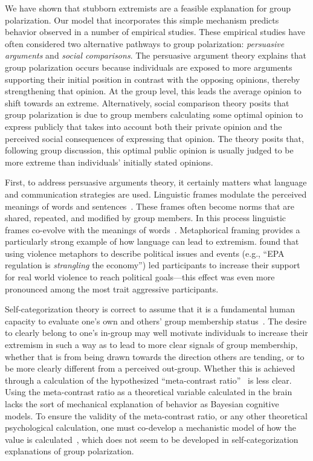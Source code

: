 We have shown that stubborn extremists are a feasible explanation for group
polarization. Our model that incorporates this simple mechanism predicts
behavior observed in a number of empirical studies. These empirical studies have
often considered two alternative pathways to group polarization: 
\emph{persuasive arguments} and \emph{social comparisons}. The persuasive
argument theory explains that group polarization occurs because individuals
are exposed to more arguments supporting their initial position in contrast with the opposing opinions, thereby strengthening that opinion. 
At the group level, this leads the average opinion to shift towards
an extreme. Alternatively, social comparison theory posits that group 
polarization is due to group members calculating some optimal opinion to express publicly that takes into account both their private opinion and the perceived social consequences of expressing that opinion. The theory posits that, following group discussion, this optimal public opinion is usually judged to be more extreme than individuals' initially stated opinions.

First, to address persuasive arguments theory, 
it certainly matters what language and communication strategies are used.  %
Linguistic frames modulate the perceived meanings of words and sentences~\cite{Fillmore1982,Chong2007,Cacciatore2016}.
These frames often become norms that are shared, repeated, and 
modified by group members.
In this process linguistic frames co-evolve with the meanings of words~\cite{Hamilton2016,Garg2018,Hawkins2020}.
Metaphorical framing provides a particularly strong example of how language can
lead to extremism.  found that using violence
metaphors to describe political issues and events (e.g., ``EPA regulation
is \emph{strangling} the economy'') led participants to increase their support
for real world violence to reach political goals---this effect was even more
pronounced among the most trait aggressive participants.

Self-categorization theory is correct to assume that it is a fundamental human capacity 
to evaluate one's own and others' group membership status~\cite{Cikara2014,Cikara2017}. 
The desire to clearly belong
to one's in-group may well motivate individuals to increase their extremism 
in such a way as to lead to more clear signals of group membership, whether that is
from being drawn towards the direction others are tending, or to be more
clearly different from a perceived out-group.
Whether this is achieved through a calculation of the 
hypothesized ``meta-contrast ratio''~\cite{Turner1987} is less clear.
Using the meta-contrast ratio as a theoretical variable
calculated in the brain lacks the sort of mechanical explanation of behavior
as Bayesian cognitive models. To ensure the validity of the meta-contrast ratio,
or any other theoretical psychological calculation, one must co-develop a 
mechanistic model of how the value is calculated~\cite{Jones2011}, which does
not seem to be developed in self-categorization explanations of group polarization.

